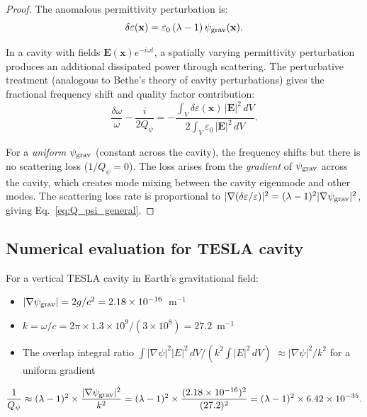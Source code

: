 \documentclass[11pt]{article}
\newcommand{\lam}{\lambda}
\newcommand{\Qpsi}{Q_\psi}
\newcommand{\ee}[1]{\times 10^{#1}}
\newcommand{\psigrav}{\psi_{\rm grav}}
\theoremstyle{definition}
\theoremstyle{remark}
\begin{document}
\begin{proof}
The anomalous permittivity perturbation is:
\begin{equation}
\delta\varepsilon(\mathbf{x}) = \varepsilon_0\,(\lam-1)\,\psigrav(\mathbf{x}).
\end{equation}

In a cavity with fields $\mathbf{E}(\mathbf{x})e^{-i\omega t}$, a
spatially varying permittivity perturbation produces an additional
dissipated power through scattering. The perturbative treatment
(analogous to Bethe's theory of cavity perturbations) gives the
fractional frequency shift and quality factor contribution:
\begin{equation}
\frac{\delta\omega}{\omega} - \frac{i}{2\Qpsi}
= -\frac{\int_V \delta\varepsilon(\mathbf{x})\,|\mathbf{E}|^2\,dV}
{2\int_V \varepsilon_0\,|\mathbf{E}|^2\,dV}.
\end{equation}

For a \emph{uniform} $\psigrav$ (constant across the cavity), the
frequency shifts but there is no scattering loss ($1/\Qpsi = 0$).
The loss arises from the \emph{gradient} of $\psigrav$ across the
cavity, which creates mode mixing between the cavity eigenmode and
other modes. The scattering loss rate is proportional to
$|\nabla(\delta\varepsilon/\varepsilon)|^2 = (\lam-1)^2|\nabla\psigrav|^2$,
giving Eq.~\eqref{eq:Q_psi_general}.
\end{proof}


\subsection{Numerical evaluation for TESLA cavity}

For a vertical TESLA cavity in Earth's gravitational field:
\begin{itemize}[nosep]
\item $|\nabla\psigrav| = 2g/c^2 = 2.18\ee{-16}$~m$^{-1}$
\item $k = \omega/c = 2\pi\times1.3\ee{9}/(3\ee{8}) = 27.2$~m$^{-1}$
\item The overlap integral ratio $\int|\nabla\psi|^2|E|^2\,dV /
  (k^2\int|E|^2\,dV)$ $\approx |\nabla\psi|^2/k^2$ for a uniform
  gradient
\end{itemize}

\begin{equation}
\frac{1}{\Qpsi} \approx (\lam-1)^2\times\frac{|\nabla\psigrav|^2}{k^2}
= (\lam-1)^2\times\frac{(2.18\ee{-16})^2}{(27.2)^2}
= (\lam-1)^2\times 6.42\ee{-35}.
\label{eq:Q_psi_numerical}
\end{equation}
\end{document}

